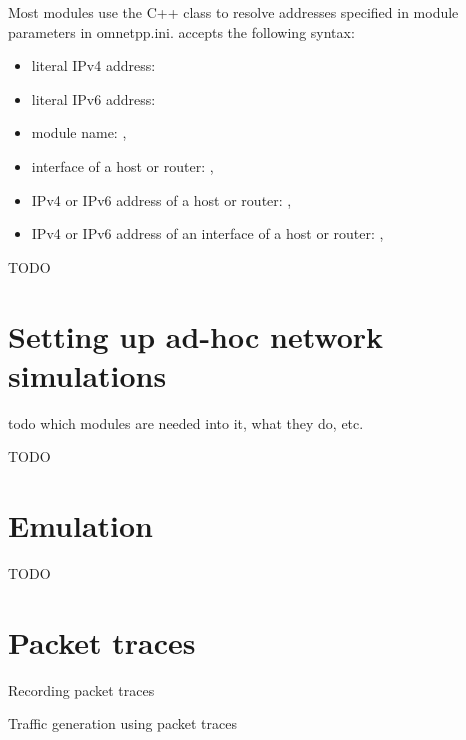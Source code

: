 Most modules use the  C++ class to resolve addresses
specified in module parameters in omnetpp.ini.
 accepts the following syntax:

\begin{itemize}
  \item literal IPv4 address: 
  \item literal IPv6 address: 
  \item module name: , 
  \item interface of a host or router: , 
  \item IPv4 or IPv6 address of a host or router: ,
  \item IPv4 or IPv6 address of an interface of a host or router:
      , 
\end{itemize}


\ifdraft TODO
\section{Setting up ad-hoc network simulations}

todo which modules are needed into it, what they do, etc.
\fi

\ifdraft TODO
\section{Emulation}
\fi

\ifdraft TODO
\section{Packet traces}

Recording packet traces

Traffic generation using packet traces
\fi





